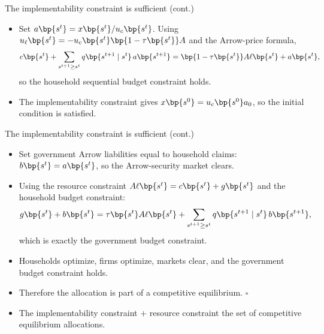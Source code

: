 \documentclass[11pt,xcolor={dvipsnames},aspectratio=159,hyperref={pdftex,pdfpagemode=UseNone,hidelinks,pdfdisplaydoctitle=true},usepdftitle=false]{beamer}
\begin{document}
            \begin{frame}{The implementability constraint is sufficient (cont.)}
                \begin{itemize}
                \item Set $a\bp{s^t} = x\bp{s^t}/u_c\bp{s^t}$. Using $u_\ell\bp{s^t} = -u_c\bp{s^t}\bp{1-\tau\bp{s^t}}A$ and the Arrow-price formula,
                \begin{align*}
                    c\bp{s^t} + \sum_{s^{t+1}\ge s^t} q\bp{s^{t+1}\mid s^t}\, a\bp{s^{t+1}}
                    = \bp{1-\tau\bp{s^t}}A\ell\bp{s^t} + a\bp{s^t},
                \end{align*}
                so the household sequential budget constraint holds.
                \item The implementability constraint gives $x\bp{s^0} = u_c\bp{s^0} a_0$, so the initial condition is satisfied.
                \end{itemize}
            \end{frame}

            \begin{frame}{The implementability constraint is sufficient (cont.)}
                \begin{itemize}
                \item Set government Arrow liabilities equal to household claims: $b\bp{s^t} = a\bp{s^t}$, so the Arrow-security market clears.
                \item Using the resource constraint $A\ell\bp{s^t} = c\bp{s^t} + g\bp{s^t}$ and the household budget constraint:
                \begin{align*}
                    g\bp{s^t} + b\bp{s^t}
                    = \tau\bp{s^t} A\ell\bp{s^t} + \sum_{s^{t+1}\ge s^t} q\bp{s^{t+1}\mid s^t}\, b\bp{s^{t+1}},
                \end{align*}
                which is exactly the government budget constraint.
                \item Households optimize, firms optimize, markets clear, and the government budget constraint holds.
                \item Therefore the allocation is part of a competitive equilibrium. $\square$
                \item The implementability constraint $+$ resource constraint  the set of competitive equilibrium allocations.
                \end{itemize}
            \end{frame}
\end{document}
